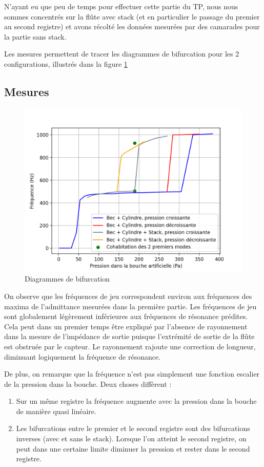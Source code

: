 \documentclass[atiam, article]{rapport} %
\begin{document}
N'ayant eu que peu de temps pour effectuer cette partie du TP, nous nous sommes concentrés sur la flûte avec stack (et en particulier le passage du premier au second registre) et avons récolté les données mesurées par des camarades pour la partie sans stack.

Les mesures permettent de tracer les diagrammes de bifurcation pour les 2 configurations, illustrés dans la figure \ref{fig:bifurc}

\subsection{Mesures}
\begin{figure}
    \centering
    \includegraphics[width=\textwidth]{vents/images_vents/Diagramme bifurcation.png}
    \caption{Diagrammes de bifurcation}
    \label{fig:bifurc}
\end{figure}

On observe que les fréquences de jeu correspondent environ aux fréquences des maxima de l'admittance mesurées dans la première partie. 
Les fréquences de jeu sont globalement légèrement inférieures aux fréquences de résonance prédites. Cela peut dans un premier temps être expliqué par l'absence de rayonnement dans la mesure de l'impédance de sortie puisque l'extrémité de sortie de la flûte est obstruée par le capteur. Le rayonnement rajoute une correction de longueur, diminuant logiquement la fréquence de résonance. %

De plus, on remarque que la fréquence n'est pas simplement une fonction escalier de la pression dans la bouche. Deux choses diffèrent :
\begin{enumerate}
    \item Sur un même registre la fréquence augmente avec la pression dans la bouche de manière quasi linéaire.
    \item Les bifurcations entre le premier et le second registre sont des bifurcations inverses (avec et sans le stack). Lorsque l'on atteint le second registre, on peut dans une certaine limite diminuer la pression et rester dans le second registre.
\end{enumerate}
\end{document}
